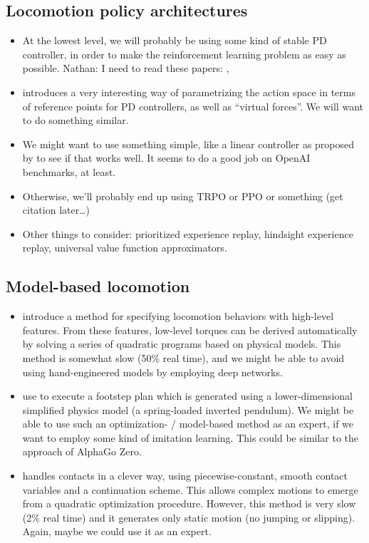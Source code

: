 \documentclass[a4paper]{article}
\newcommand{\nhatch}[1]{{\leavevmode\color{blue} Nathan: #1}}
\begin{document}
\subsection*{Locomotion policy architectures}

\begin{itemize}
  \item At the lowest level, we will probably be using some kind of stable PD controller, in order to make the reinforcement learning problem as easy as possible.
    \nhatch{I need to read these papers:} \cite{tan2011stable}, \cite{shrivastava2013stable}
  \item \cite{peng2015terrain} introduces a very interesting way of parametrizing the action space in terms of reference points for PD controllers, as well as ``virtual forces''.
    We will want to do something similar.
  \item We might want to use something simple, like a linear controller as proposed by \cite{mania2018simple} to see if that works well.
    It seems to do a good job on OpenAI benchmarks, at least.
  \item Otherwise, we'll probably end up using TRPO or PPO or something (get citation later\dots)
  \item Other things to consider: prioritized experience replay, hindsight experience replay, universal value function approximators.
\end{itemize}


\subsection*{Model-based locomotion}

\begin{itemize}
  \item \cite{de2010feature} introduce a method for specifying locomotion behaviors with high-level features.
    From these features, low-level torques can be derived automatically by solving a series of quadratic programs based on physical models.
    This method is somewhat slow (50\% real time), and we might be able to avoid using hand-engineered models by employing deep networks.

  \item \cite{mordatch2010robust} use \cite{de2010feature} to execute a footstep plan which is generated using a lower-dimensional simplified physics model (a spring-loaded inverted pendulum).
    We might be able to use such an optimization- / model-based method as an expert, if we want to employ some kind of imitation learning.
    This could be similar to the approach of AlphaGo Zero.

  \item \cite{mordatch2012discovery} handles contacts in a clever way, using piecewise-constant, smooth contact variables and a continuation scheme.
    This allows complex motions to emerge from a quadratic optimization procedure.
    However, this method is very slow (2\% real time) and it generates only static motion (no jumping or slipping).
    Again, maybe we could use it as an expert.

\end{itemize}
\end{document}
